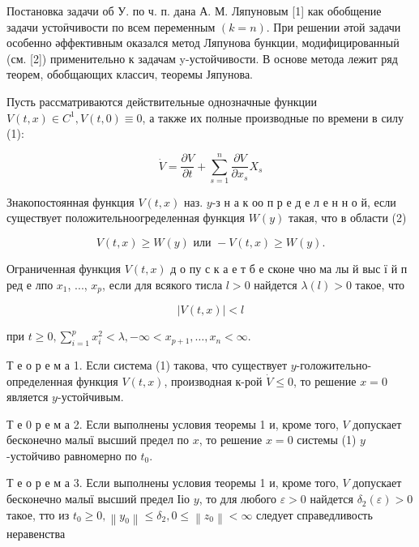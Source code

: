 \documentclass[10pt]{article}
\begin{document}
Постановка задачи об У. по ч. п. дана А. М. Ляпуновым [1] как обобщение задачи устоӥчивости по всем переменным $(k=n)$. При решении әтой задачи особенно әффективным оказался метод Ляпунова бункции, модифицированныӥ (см. [2]) применительно к задачам y-устойчивости. В основе метода лежит ряд теорем, обобщающих классич, теоремы Јяпунова.



Пусть рассматриваются действительные однозначные функции $V(t, x) \in C^{1}, V(t, 0) \equiv 0$, а также их полные производные по времени в силу (1):



\[

\dot{V}=\frac{\partial V}{\partial t}+\sum_{s=1}^{n} \frac{\partial V}{\partial x_{s}} X_{s}

\]



Знакопостоянная функция $V(t, x)$ наз. $y$-з н а к оо п р е д е л е н н о й, если существует положительноогределенная функция $W(y)$ такая, что в области (2)



\[

V(t, x) \geqslant W(y) \text { или }-V(t, x) \geqslant W(y) .

\]



Ограниченная функция $V(t, x)$ д о пу с к а е т б е сконе чно ма лы й выс ї й п ред е лпо $x_{1}$, ..., $x_{p}$, если для всякого тисла $l>0$ найдется $\lambda(l)>0$ такое, что



\[

|V(t, x)|<l

\]



при $t \geqslant 0, \sum_{i=1}^{p} x_{i}^{2}<\lambda,-\infty<x_{p+1}, \ldots, x_{n}<\infty$.



Т е о р е м а 1. Если система (1) такова, что существует $y$-голожительно-определенная функция $V(t, x)$, производная к-рой $\dot{V} \leqslant 0$, то решение $x=0$ является $y$-устойчивым.



Т е 0 р е м а 2. Если выполнены условия теоремы 1 и, кроме того, $V$ допускает бесконечно малыї высший предел по $x$, то решение $x=0$ системы (1) $y$-устойчиво равномерно по $t_{0}$.



Т е о р е м а 3. Если выполнены условия теоремы 1 и, кроме того, $V$ допускает бесконечно малыї высший предел Ііо $y$, то для любого $\varepsilon>0$ найдется $\delta_{2}(\varepsilon)>0$ такое, тто из $t_{0} \geqslant 0,\left\|y_{0}\right\| \leqslant \delta_{2}, 0 \leqslant\left\|z_{0}\right\|<\infty$ следует справедливость неравенства
\end{document}
